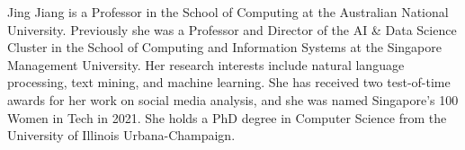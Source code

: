 Jing Jiang is a Professor in the School of Computing at the Australian National University. Previously she was a Professor and Director of the AI \& Data Science Cluster in the School of Computing and Information Systems at the Singapore Management University. Her research interests include natural language processing, text mining, and machine learning. She has received two test-of-time awards for her work on social media analysis, and she was named Singapore’s 100 Women in Tech in 2021. She holds a PhD degree in Computer Science from the University of Illinois Urbana-Champaign.